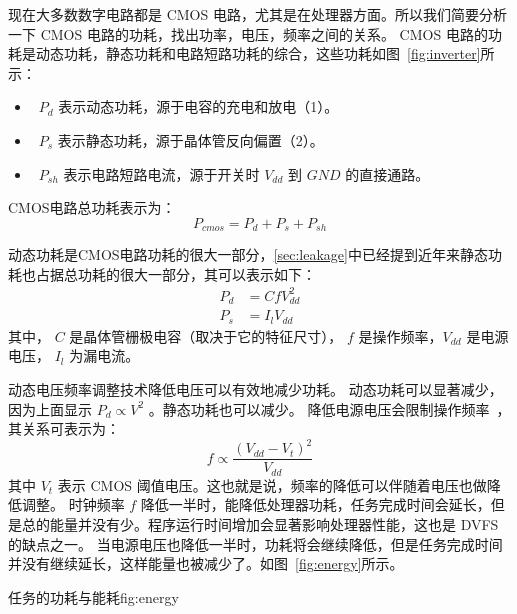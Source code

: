 现在大多数数字电路都是 CMOS 电路，尤其是在处理器方面。所以我们简要分析一下 CMOS 电路的功耗，找出功率，电压，频率之间的关系。
CMOS 电路的功耗是动态功耗，静态功耗和电路短路功耗的综合，这些功耗如图~\ref{fig:inverter}所示：
\begin{itemize}
\item  ~$P_d$ 表示动态功耗，源于电容的充电和放电（1）。
\item  ~$P_s$ 表示静态功耗，源于晶体管反向偏置（2）。
\item  ~$P_{sh}$ 表示电路短路电流，源于开关时 $V_{dd}$ 到 $GND$ 的直接通路。
\end{itemize}
CMOS电路总功耗表示为：
\begin{equation}\label{eq:cmos}
P_{cmos} = P_d + P_s + P_{sh} 
\end{equation}


动态功耗是CMOS电路功耗的很大一部分，\ref{sec:leakage}中已经提到近年来静态功耗也占据总功耗的很大一部分，其可以表示如下：
\begin{equation}\label{eq:DVFS}
\begin{split}
P_d &= CfV_{dd}^2 \\
P_s &= I_lV_{dd}  
\end{split}
\end{equation}
其中，  $C$ 是晶体管栅极电容（取决于它的特征尺寸），
$f$ 是操作频率，$V_{dd}$ 是电源电压， $I_l$ 为漏电流。

动态电压频率调整技术降低电压可以有效地减少功耗。
动态功耗可以显著减少，因为上面显示 $P_d \propto V^2$ 。静态功耗也可以减少。
 降低电源电压会限制操作频率~\cite{suleiman2005dynamic}，其关系可表示为：
 \begin{equation}\label{eq:fv}
 f \propto \frac{(V_{dd} - V_t)^2}{V_{dd}} 
 \end{equation}
 其中 $V_t$ 表示 CMOS 阈值电压。这也就是说，频率的降低可以伴随着电压也做降低调整。
 时钟频率 $f$ 降低一半时，能降低处理器功耗，任务完成时间会延长，但是总的能量并没有少。程序运行时间增加会显著影响处理器性能，这也是 DVFS 的缺点之一。
 当电源电压也降低一半时，功耗将会继续降低，但是任务完成时间并没有继续延长，这样能量也被减少了。如图~\ref{fig:energy}所示。
 
\begin{pics}{任务的功耗与能耗}{fig:energy}
\end{pics}

